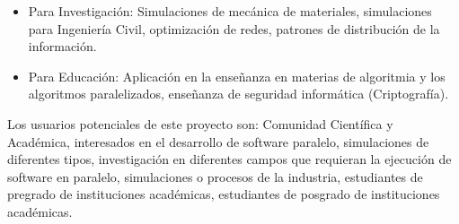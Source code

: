 \begin{itemize}
\begin{itemize}


		\item Para Investigación: Simulaciones de mecánica de materiales, simulaciones para Ingeniería Civil, optimización de redes, patrones de distribución de la información.


		\item Para Educación: Aplicación en la enseñanza en materias de algoritmia y los algoritmos paralelizados, 		enseñanza de seguridad informática (Criptografía).



	\end{itemize}

		Los usuarios potenciales de este proyecto son: Comunidad Científica y Académica, interesados en el desarrollo de software paralelo, simulaciones de diferentes tipos, investigación en diferentes campos que requieran la ejecución de software en paralelo,  simulaciones o procesos de la industria, estudiantes de pregrado de instituciones académicas, estudiantes de posgrado de instituciones académicas. 


\end{itemize}


